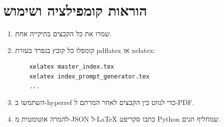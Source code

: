 \documentclass[12pt]{article}
\begin{document}
\section*{הוראות קומפילציה ושימוש}
\begin{enumerate}
  \item שמרו את כל הקבצים בתיקייה אחת.
  \item קומפלו כל קובץ בנפרד בעזרת pdflatex או xelatex:
    \begin{verbatim}
    xelatex master_index.tex
    xelatex index_prompt_generator.tex
    ...
    \end{verbatim}
  \item השתמשו ב-hyperref כדי לנווט בין הקבצים לאחר המרתם ל-PDF.
  \item להמרה אוטומטית מ-JSON ל-LaTeX כתבו סקריפט Python שמחליף תגים.
\end{enumerate}
\end{document}
